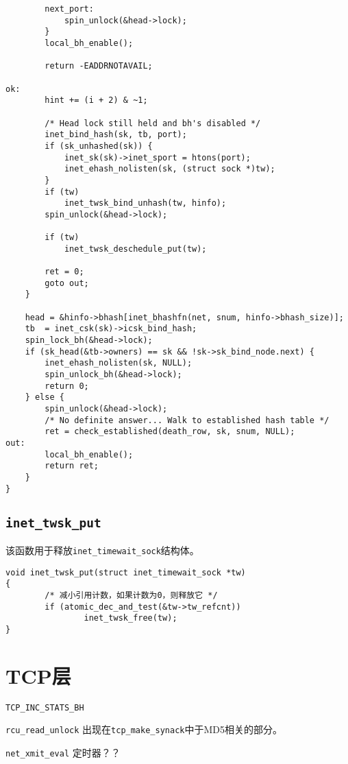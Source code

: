\begin{verbatim}
        next_port:
            spin_unlock(&head->lock);
        }
        local_bh_enable();

        return -EADDRNOTAVAIL;

ok:
        hint += (i + 2) & ~1;

        /* Head lock still held and bh's disabled */
        inet_bind_hash(sk, tb, port);
        if (sk_unhashed(sk)) {
            inet_sk(sk)->inet_sport = htons(port);
            inet_ehash_nolisten(sk, (struct sock *)tw);
        }
        if (tw)
            inet_twsk_bind_unhash(tw, hinfo);
        spin_unlock(&head->lock);

        if (tw)
            inet_twsk_deschedule_put(tw);

        ret = 0;
        goto out;
    }

    head = &hinfo->bhash[inet_bhashfn(net, snum, hinfo->bhash_size)];
    tb  = inet_csk(sk)->icsk_bind_hash;
    spin_lock_bh(&head->lock);
    if (sk_head(&tb->owners) == sk && !sk->sk_bind_node.next) {
        inet_ehash_nolisten(sk, NULL);
        spin_unlock_bh(&head->lock);
        return 0;
    } else {
        spin_unlock(&head->lock);
        /* No definite answer... Walk to established hash table */
        ret = check_established(death_row, sk, snum, NULL);
out:
        local_bh_enable();
        return ret;
    }
}
\end{verbatim}

\subsection{\texttt{inet_twsk_put}}
该函数用于释放\texttt{inet_timewait_sock}结构体。
\begin{verbatim}
void inet_twsk_put(struct inet_timewait_sock *tw)
{
        /* 减小引用计数，如果计数为0，则释放它 */
        if (atomic_dec_and_test(&tw->tw_refcnt))
                inet_twsk_free(tw);
}
\end{verbatim}

\section{TCP层}

    \texttt{TCP_INC_STATS_BH}

    \texttt{rcu_read_unlock} 出现在\texttt{tcp_make_synack}中于MD5相关的部分。
    
    \texttt{net_xmit_eval}   定时器？？

